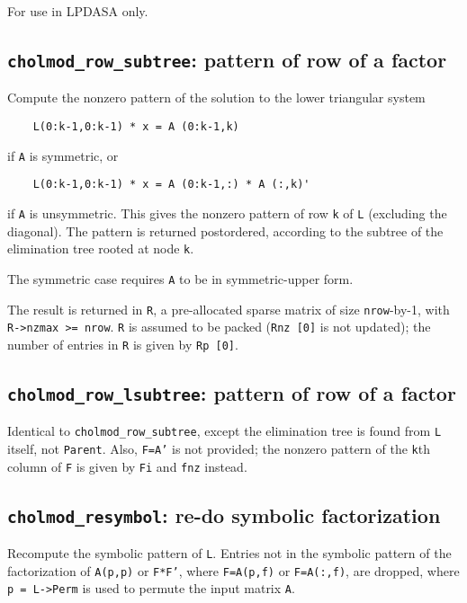 \documentclass[11pt]{article}
\begin{document}

For use in LPDASA only.


\subsection{{\tt cholmod\_row\_subtree}: pattern of row of a factor}


Compute the nonzero pattern of the solution to the lower triangular system
\begin{verbatim}
    L(0:k-1,0:k-1) * x = A (0:k-1,k)
\end{verbatim}
if {\tt A} is symmetric, or
\begin{verbatim}
    L(0:k-1,0:k-1) * x = A (0:k-1,:) * A (:,k)'
\end{verbatim}
if {\tt A} is unsymmetric.
This gives the nonzero pattern of row {\tt k} of {\tt L} (excluding the diagonal).
The pattern is returned postordered, according to the subtree of the elimination
tree rooted at node {\tt k}.

The symmetric case requires {\tt A} to be in symmetric-upper form.

The result is returned in {\tt R}, a pre-allocated sparse matrix of size {\tt nrow}-by-1,
with {\tt R->nzmax >= nrow}.  {\tt R} is assumed to be packed ({\tt Rnz [0]} is not updated);
the number of entries in {\tt R} is given by {\tt Rp [0]}.

\subsection{{\tt cholmod\_row\_lsubtree}: pattern of row of a factor}


Identical to {\tt cholmod\_row\_subtree}, except the elimination tree is
found from {\tt L} itself, not {\tt Parent}.  Also, {\tt F=A'} is not provided;
the nonzero pattern of the {\tt k}th column of {\tt F} is given by 
{\tt Fi} and {\tt fnz} instead.

\subsection{{\tt cholmod\_resymbol}: re-do symbolic factorization}


Recompute the symbolic pattern of {\tt L}.  Entries not in the symbolic pattern
of the factorization of {\tt A(p,p)} or {\tt F*F'}, where
{\tt F=A(p,f)} or {\tt F=A(:,f)}, are dropped, where
{\tt p = L->Perm} is used to permute the input matrix {\tt A}.
\end{document}
